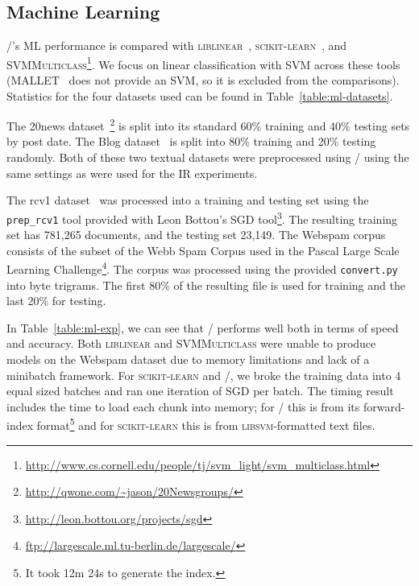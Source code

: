 





\subsection{Machine Learning}

\meta/'s ML performance is compared with \textsc{liblinear}~\citep{liblinear},
\textsc{scikit-learn}~\citep{scikit}, and
\textsc{SVMMulticlass}\footnote{\url{http://www.cs.cornell.edu/people/tj/svm_light/svm_multiclass.html}}. We focus on linear classification
with SVM across these tools (MALLET~\citep{mallet} does not provide an SVM, so it
is excluded from the comparisons).
Statistics for the four datasets used can be found in
Table~\ref{table:ml-datasets}.

The 20news
dataset~\citep{Lang:1995:ICML}\footnote{\url{http://qwone.com/~jason/20Newsgroups/}}
is split into its standard 60\% training and 40\% testing sets by post
date. The Blog dataset~\citep{blog} is split into 80\% training and 20\%
testing randomly. Both of these two textual datasets were preprocessed
using \meta/ using the same settings as were used for the IR experiments.

The rcv1 dataset~\citep{rcv1} was processed into a training and testing set
using the \texttt{prep\_rcv1} tool provided with Leon Bottou's SGD
tool\footnote{\url{http://leon.bottou.org/projects/sgd}}. The resulting
training set has 781,265 documents, and the testing set 23,149. The Webspam
corpus~\citep{Webb:2006:CEAS} consists of the subset of the Webb Spam Corpus
used in the Pascal Large Scale Learning
Challenge\footnote{\url{ftp://largescale.ml.tu-berlin.de/largescale/}}.
The corpus was processed using the provided \texttt{convert.py} into byte
trigrams. The first 80\% of the resulting file is used for training and the
last 20\% for testing.

In Table~\ref{table:ml-exp}, we can see that \meta/ performs well both in
terms of speed and accuracy. Both \textsc{liblinear} and
\textsc{SVMMulticlass} were unable to produce models on the Webspam dataset
due to memory limitations and lack of a minibatch framework. For
\textsc{scikit-learn} and \meta/, we broke the training data into 4 equal
sized batches and ran one iteration of SGD per batch. The timing result
includes the time to load each chunk into memory; for \meta/ this is from
its forward-index format\footnote{It took 12m 24s to generate the index.}
and for \textsc{scikit-learn} this is from \textsc{libsvm}-formatted text
files.



